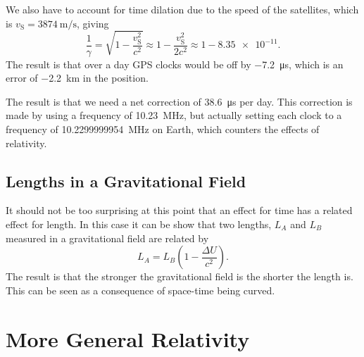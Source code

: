 \documentclass[fleqn]{NotesClass}
\begin{document}
    We also have to account for time dilation due to the speed of the satellites, which is \(v_{\mathrm{S}} = \qty{3874}{\metre\per\second}\), giving
    \begin{equation}
        \frac{1}{\gamma} = \sqrt{1 - \frac{v_{\mathrm{S}}^2}{c^2}} \approx 1 - \frac{v_{\mathrm{S}}^2}{2c^2} \approx 1 - \num{8.35e-11}.
    \end{equation}
    The result is that over a day GPS clocks would be off by \qty{-7.2}{\micro\second}, which is an error of \qty{-2.2}{\kilo\metre} in the position.
    
    The result is that we need a net correction of \qty{38.6}{\micro\second} per day.
    This correction is made by using a frequency of \qty{10.23}{\mega\hertz}, but actually setting each clock to a frequency of \qty{10.2299999954}{\mega\hertz} on Earth, which counters the effects of relativity.
    
    \section{Lengths in a Gravitational Field}
    It should not be too surprising at this point that an effect for time has a related effect for length.
    In this case it can be show that two lengths, \(L_A\) and \(L_B\) measured in a gravitational field are related by
    \begin{equation}
        L_A = L_B\left( 1 - \frac{\Delta U}{c^2} \right).
    \end{equation}
    The result is that the stronger the gravitational field is the shorter the length is.
    This can be seen as a consequence of space-time being curved.
    
    \chapter{More General Relativity}
\end{document}
